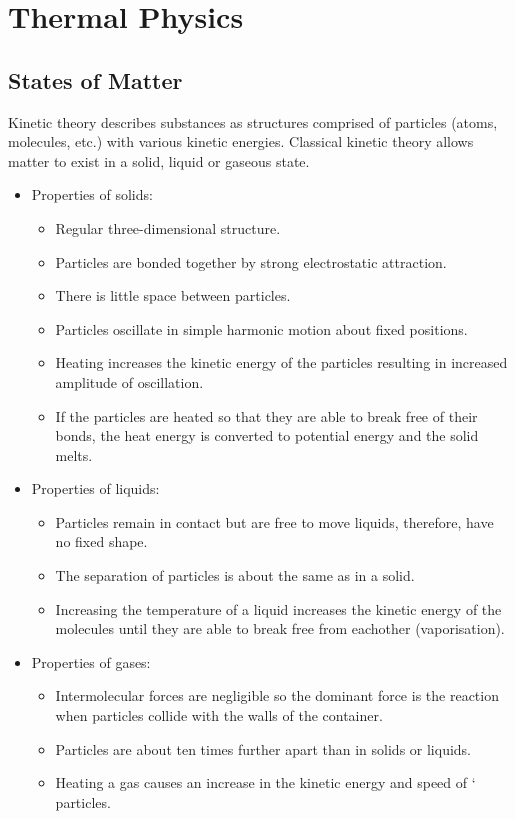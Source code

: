 \documentclass[a4,8pt]{article}
\begin{document}
\section{Thermal Physics}
\subsection{States of Matter}
Kinetic theory describes substances as structures comprised of particles (atoms, molecules, 
etc.) with various kinetic energies. Classical kinetic theory allows matter to exist in a 
solid, liquid or gaseous state.

\begin{itemize}
	\item Properties of solids:
		\begin{itemize}
			\item Regular three-dimensional structure.
			\item Particles are bonded together by strong electrostatic attraction.
			\item There is little space between particles.
			\item Particles oscillate in simple harmonic motion about fixed positions.
			\item Heating increases the kinetic energy of the particles resulting in 
            increased amplitude of oscillation.
			\item If the particles are heated so that they are able to break free of their 
            bonds, the heat energy is converted to potential energy and the solid melts.
		\end{itemize}
	\item Properties of liquids:
		\begin{itemize}
			\item Particles remain in contact but are free to move liquids, therefore, have 
            no fixed shape.
			\item The separation of particles is about the same as in a solid.
			\item Increasing the temperature of a liquid increases the kinetic energy of the 
            molecules until they are able to break free from eachother (vaporisation).
		\end{itemize}
	\item Properties of gases:
		\begin{itemize}
			\item Intermolecular forces are negligible so the dominant force is the reaction 
            when particles collide with the walls of the container.
			\item Particles are about ten times further apart than in solids or liquids.
			\item Heating a gas causes an increase in the kinetic energy and speed of 
`           particles.
		\end{itemize}
\end{itemize}
\end{document}

